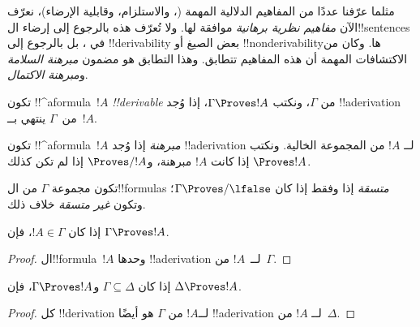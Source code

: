 \documentclass[../../../include/open-logic-section]{subfiles}
\begin{document}
      {}
      {}


\begin{explain}
مثلما عرّفنا عددًا من المفاهيم الدلالية المهمة
(، والاستلزام، وقابلية الإرضاء)، نعرّف
الآن \emph{مفاهيم نظرية برهانية} موافقة لها. ولا تُعرّف هذه بالرجوع إلى
إرضاء ال!!{sentence}s في
، بل بالرجوع إلى
!!{derivability} بعض الصيغ أو !!{nonderivability}ها. وكان من الاكتشافات
المهمة أن هذه المفاهيم تتطابق. وهذا التطابق هو مضمون \emph{مبرهنة السلامة}
و\emph{مبرهنة الاكتمال}.
\end{explain}

\begin{defn}[!!^{derivability}]
تكون !!^a{formula}~$!A$ \emph{!!{derivable}} من $\Gamma$، ونكتب
$\Gamma \Proves !A$، إذا وُجد !!a{derivation} من~$\Gamma$ ينتهي
بــ~$!A$.
\end{defn}

\begin{defn}[المبرهنات]
تكون !!^a{formula}~$!A$ \emph{مبرهنة} إذا وُجد !!a{derivation} لــ
$!A$ من المجموعة الخالية. ونكتب $\Proves !A$ إذا كانت $!A$ مبرهنة،
و$\Proves/ !A$ إذا لم تكن كذلك.
\end{defn}

\begin{defn}[الاتساق]
تكون مجموعة $\Gamma$ من ال!!{formula}s \emph{متسقة} إذا وفقط إذا كان
$\Gamma\Proves/ \lfalse$؛ وتكون \emph{غير متسقة} خلاف ذلك.
\end{defn}

\begin{prop}[الانعكاسية]
إذا كان $!A \in \Gamma$، فإن $\Gamma \Proves !A$.
\end{prop}

\begin{proof}
  ال!!{formula}~$!A$ وحدها !!a{derivation} لــ~$!A$ من~$\Gamma$.
\end{proof}

\begin{prop}[الرتابة]
إذا كان $\Gamma \subseteq \Delta$ و$\Gamma \Proves !A$، فإن $\Delta
\Proves !A$.
\end{prop}

\begin{proof}
كل !!{derivation} لــ$!A$ من $\Gamma$ هو أيضًا !!a{derivation} لــ
$!A$ من~$\Delta$.
\end{proof}
\end{document}
